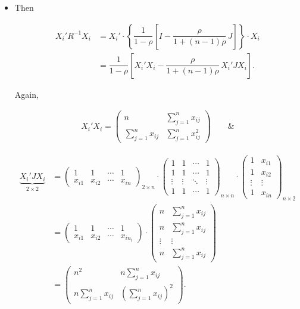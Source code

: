\documentclass[11pt, a4paper]{article}
\begin{document}
\begin{itemize}
Substituting in (\ref{R_inverse_assumption})
\begin{equation}\label{R_inverse}
R^{-1} = \dfrac{1}{1-\rho}\left[ I - \dfrac{\rho}{1 + (n-1)\rho}\, J \right].
\end{equation}

\item[\scalebox{2.0}{\twemoji{keycap: 2}}] \hspace{0.2cm} Then

\begin{align*}
X_i'R^{-1}X_i &= X_i' \cdot \left\{ \dfrac{1}{1-\rho}\left[ I - \dfrac{\rho}{1 + (n-1)\rho}\, J \right] \right\} \cdot X_i \\[1em]
&= \dfrac{1}{1-\rho}\left[ X_i' X_i - \dfrac{\rho}{1 + (n-1)\rho}\, X_i' J X_i \right].
\end{align*}

Again,

\begin{align*}
X_i' X_i =
\begin{pmatrix}
n & \sum\limits_{j=1}^{n} x_{ij} \\
\sum\limits_{j=1}^{n} x_{ij} & \sum\limits_{j=1}^{n} x_{ij}^2
\end{pmatrix} \qquad \&
\end{align*}

\begin{align*}
\underbrace{X_i' J X_i}_{2 \times 2} &= \begin{pmatrix}
1 & 1 & \cdots & 1 \\
x_{i1} & x_{i2} & \cdots & x_{i n}
\end{pmatrix}_{2 \times n}
\cdot
\begin{pmatrix}
1 & 1 & \cdots & 1 \\
1 & 1 & \cdots & 1 \\
\vdots & \vdots & \ddots & \vdots \\
1 & 1 & \cdots & 1
\end{pmatrix}_{n \times n}
\cdot
\begin{pmatrix}
1 & x_{i1} \\
1 & x_{i2} \\
\vdots & \vdots \\
1 & x_{i n}
\end{pmatrix}_{n \times 2} \\[1em]
&=
\begin{pmatrix}
1 & 1 & \cdots & 1 \\
x_{i1} & x_{i2} & \cdots & x_{i n_i}
\end{pmatrix}
\cdot
\begin{pmatrix}
n & \sum\limits_{j=1}^{n} x_{ij} \\
n & \sum\limits_{j=1}^{n} x_{ij} \\
\vdots & \vdots \\
n & \sum\limits_{j=1}^{n} x_{ij}
\end{pmatrix} \\[1em]
&=
\begin{pmatrix}
n^2 & n \sum\limits_{j=1}^{n} x_{ij} \\
n \sum\limits_{j=1}^{n} x_{ij} & \left(\sum\limits_{j=1}^{n} x_{ij}\right)^2
\end{pmatrix}.
\end{align*}


\end{itemize}
\end{document}
